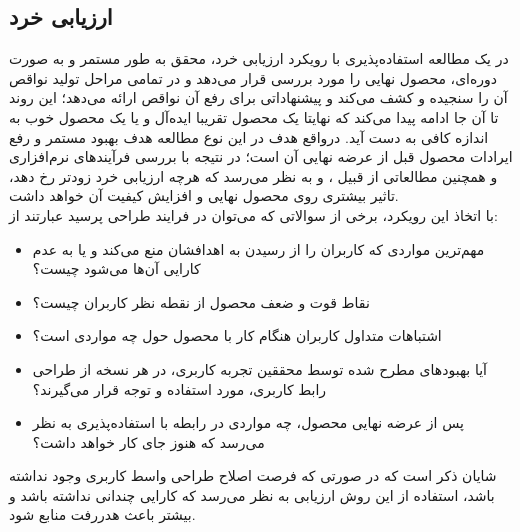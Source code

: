 \subsection{ارزیابی خرد}
در یک مطالعه استفاده‌پذیری با رویکرد ارزیابی خرد، محقق به طور مستمر و به صورت دوره‌ای، محصول نهایی را مورد بررسی قرار می‌دهد و در تمامی مراحل تولید نواقص آن را سنجیده و کشف می‌کند و پیشنهاداتی برای رفع آن نواقص ارائه می‌دهد؛ این روند  تا آن جا ادامه پیدا می‌کند که نهایتا یک محصول تقریبا ایده‌آل و یا یک محصول خوب به اندازه کافی
به دست آید. درواقع هدف در این نوع مطالعه هدف بهبود مستمر و رفع ایرادات محصول قبل از عرضه نهایی آن است؛ در نتیجه با بررسی فرآیندهای نرم‌افزاری و همچنین مطالعاتی از قبیل
\cite{sommerville_software_2016}،
\cite{krug_dont_2000} و
\cite{albert_measuring_2013}
به نظر می‌رسد که هرچه ارزیابی خرد زودتر رخ دهد، تاثیر بیشتری روی محصول نهایی و افزایش کیفیت آن خواهد داشت.\\
با اتخاذ این رویکرد، برخی از سوالاتی که می‌توان در فرایند طراحی پرسید عبارتند از:
\begin{itemize}
	\item 
	مهم‌ترین مواردی که کاربران را از رسیدن به اهدافشان منع می‌کند و یا به عدم کارایی آن‌ها می‌شود چیست؟
	\item 
	نقاط قوت و ضعف محصول از نقطه نظر کاربران چیست؟
	\item 
	اشتباهات متداول کاربران هنگام کار با محصول حول چه مواردی است؟
	\item 
	آیا بهبودهای مطرح شده توسط محققین تجربه کاربری، در هر نسخه از طراحی رابط کاربری، مورد استفاده و توجه قرار می‌گیرند؟
	\item 
	پس از عرضه نهایی محصول، چه مواردی در رابطه با استفاده‌پذیری به نظر می‌رسد که هنوز جای کار خواهد داشت؟
	
\end{itemize}
شایان ذکر است که در صورتی که فرصت اصلاح طراحی واسط کاربری وجود نداشته باشد، استفاده از این روش ارزیابی به نظر می‌رسد که کارایی چندانی نداشته باشد و بیشتر باعث هدررفت منابع شود.
